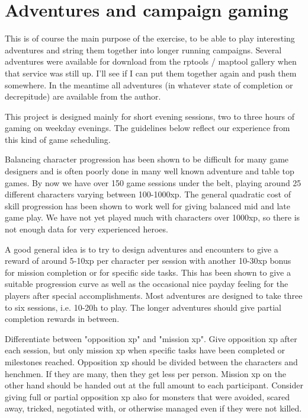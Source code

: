 \section*{Adventures and campaign gaming}
This is of course the main purpose of the exercise, to be able to play interesting adventures and string them together into longer running campaigns. Several adventures were available for download from the rptools / maptool gallery when that service was still up. I'll see if I can put them together again and push them somewhere. In the meantime all adventures (in whatever state of completion or decrepitude) are available from the author.

This project is designed mainly for short evening sessions, two to three hours of gaming on weekday evenings. The guidelines below reflect our experience from this kind of game scheduling.

Balancing character progression has been shown to be difficult for many game designers and is often poorly done in many well known adventure and table top games. By now we have over 150 game sessions under the belt, playing around 25 different characters varying between 100-1000xp. The general quadratic cost of skill progression has been shown to work well for giving balanced mid and late game play. We have not yet played much with characters over 1000xp, so there is not enough data for very experienced heroes.

A good general idea is to try to design adventures and encounters to give a reward of around 5-10xp per character per session with another 10-30xp bonus for mission completion or for specific side tasks. This has been shown to give a suitable progression curve as well as the occasional nice payday feeling for the players after special accomplishments.
Most adventures are designed to take three to six sessions, i.e. 10-20h to play. The longer adventures should give partial completion rewards in between.

Differentiate between "opposition xp" and "mission xp". Give opposition xp after each session, but only mission xp when specific tasks have been completed or milestones reached.
Opposition xp should be divided between the characters and henchmen. If they are many, then they get less per person. Mission xp on the other hand should be handed out at the full amount to each participant.
Consider giving full or partial opposition xp also for monsters that were avoided, scared away, tricked, negotiated with, or otherwise managed even if they were not killed.

